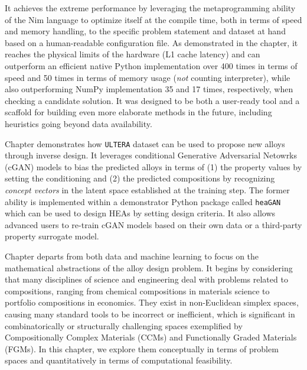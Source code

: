 It achieves the extreme performance by leveraging the metaprogramming ability of the Nim language to optimize itself at the compile time, both in terms of speed and memory handling, to the specific problem statement and dataset at hand based on a human-readable configuration file. As demonstrated in the chapter, it reaches the physical limits of the hardware (L1 cache latency) and can outperform an efficient native Python implementation over 400 times in terms of speed and 50 times in terms of memory usage (\emph{not} counting interpreter), while also outperforming NumPy implementation 35 and 17 times, respectively, when checking a candidate solution. It was designed to be both a user-ready tool and a scaffold for building even more elaborate methods in the future, including heuristics going beyond data availability. 


Chapter  demonstrates how \texttt{ULTERA} dataset can be used to propose new alloys through inverse design. It leverages conditional Generative Adversarial Netowrks (cGAN) models to bias the predicted alloys in terms of (1) the property values by setting the conditioning and (2) the predicted compositions by recognizing \emph{concept vectors} in the latent space established at the training step. The former ability is implemented within a demonstrator Python package called \texttt{heaGAN} which can be used to design HEAs by setting design criteria. It also allows advanced users to re-train cGAN models based on their own data or a third-party property surrogate model.

Chapter  departs from both data and machine learning to focus on the mathematical abstractions of the alloy design problem. It begins by considering that many disciplines of science and engineering deal with problems related to compositions, ranging from chemical compositions in materials science to portfolio compositions in economics. They exist in non-Euclidean simplex spaces, causing many standard tools to be incorrect or inefficient, which is significant in combinatorically or structurally challenging spaces exemplified by Compositionally Complex Materials (CCMs) and Functionally Graded Materials (FGMs). In this chapter, we explore them conceptually in terms of problem spaces and quantitatively in terms of computational feasibility.

